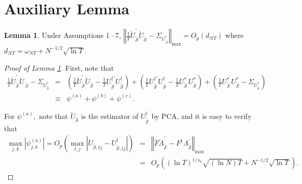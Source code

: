 ﻿\documentclass[12pt]{article}
\newcommand{\0}{\mbox{\bf 0}}
\theoremstyle{plain}%
\newtheorem{lemma}[theorem]{Lemma}
\theoremstyle{definition}
\newtheorem{lemma}[theorem]{Lemma}
\begin{document}
{\bigskip

\section{Auxiliary Lemma}\label{sec:lemma}

\begin{lemma}
\label{lm:U_Cov} Under Assumptions 1
--7, $\left\Vert \frac{1}{T}\breve{U}_{{\widetilde{ \mathcal{S} 
}}}^{\prime }\breve{U}_{{\widetilde{\mathcal{S}}}}-\Sigma _{U_{{\ \widetilde{
\mathcal{S}}}}^{\ast }}\right\Vert _{\max }=O_{p}\left( d_{NT}\right) $
where $d_{NT}=\omega _{NT}+N^{-1/2}\sqrt{\ln T}.$
\end{lemma}

\begin{proof}[Proof of Lemma \protect\ref{lm:U_Cov}]
First, note that 
\begin{eqnarray*}
\frac{1}{T}\breve{U}_{{\widetilde{\mathcal{S}}}}^{\prime }\breve{U}_{{\ 
\widetilde{\mathcal{S}}}}-\Sigma _{U_{{\widetilde{\mathcal{S}}}}^{\ast }}
&=&\left( \frac{1}{T}\breve{U}_{{\widetilde{\mathcal{S}}}}^{\prime }\breve{U}
_{{\widetilde{\mathcal{S}}}}-\frac{1}{T}U_{{\widetilde{\mathcal{S}}}
}^{\dagger \prime }U_{{\widetilde{\mathcal{S}}}}^{\dagger }\right) +\left( 
\frac{1}{T}U_{{\widetilde{\mathcal{S}}}}^{\dagger \prime }U_{{\widetilde{ 
\mathcal{S}}}}^{\dagger }-\frac{1}{T}U_{{\widetilde{\mathcal{S}}}}^{\ast
^{\prime }}U_{{\widetilde{\mathcal{S}}}}^{\ast }\right) +\left( \frac{1}{T}
U_{{\widetilde{\mathcal{S}}}}^{\ast ^{\prime }}U_{{\widetilde{\mathcal{S}}}
}^{\ast }-\Sigma _{U_{{\widetilde{\mathcal{S}}}}^{\ast }}\right) \\
&\equiv &\psi ^{(a)}+\psi ^{(b)}+\psi ^{(c)}.
\end{eqnarray*}

For $\psi ^{(a)},$ note that $\breve{U}_{{\widetilde{\mathcal{S}}}}$ is the
estimator of $U_{{\widetilde{\mathcal{S}}}}^{\dagger }$ by PCA, and it is
easy to verify that
\begin{eqnarray*} 
\max_{j,k}\left\vert \psi _{j,k}^{(a)}\right\vert
=O_{p}\left( \max_{t,j}\left\vert \breve{U}_{{\widetilde{\mathcal{S}},tj}
}-U_{{\widetilde{\mathcal{S}},tj}}^{\dagger }\right\vert \right) &=&\left\Vert 
\breve{F}\breve{\Lambda}_{\widetilde{\mathcal{S}}}^{\prime }-F^{\dagger
}\Lambda _{\widetilde{\mathcal{S}}}^{\prime }\right\Vert _{\max
}\\
&=&O_{p}\left( \left( \ln T\right) ^{1/s_{a}}\sqrt{\left( \ln N\right) T}
+N^{-1/2}\sqrt{\ln T}\right) .
\end{eqnarray*}


\end{proof}}
\end{document}
